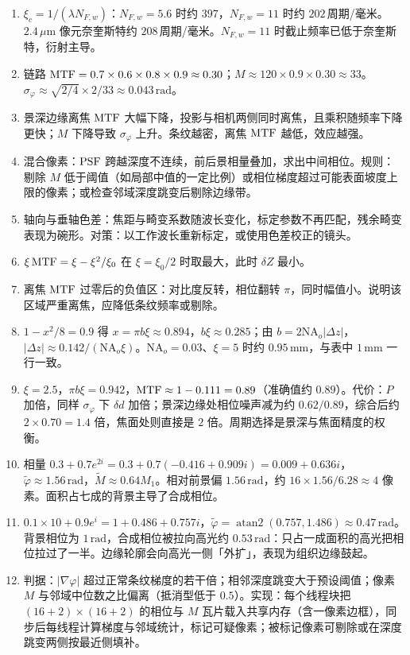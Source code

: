 \begin{enumerate}
  \item $\xi_c=1/(\lambda N_{F,w})$：$N_{F,w}=5.6$ 时约 $397$，$N_{F,w}=11$ 时约 $202\,$周期/毫米。$2.4\,\mu\mathrm{m}$ 像元奈奎斯特约 $208\,$周期/毫米。$N_{F,w}=11$ 时截止频率已低于奈奎斯特，衍射主导。
  \item 链路 $\mathrm{MTF}=0.7\times0.6\times0.8\times0.9\approx0.30$；$M\approx120\times0.9\times0.30\approx33$。$\sigma_\varphi\approx\sqrt{2/4}\times2/33\approx0.043\,\mathrm{rad}$。
  \item 景深边缘离焦 $\mathrm{MTF}$ 大幅下降，投影与相机两侧同时离焦，且乘积随频率下降更快；$M$ 下降导致 $\sigma_\varphi$ 上升。条纹越密，离焦 $\mathrm{MTF}$ 越低，效应越强。
  \item 混合像素：$\mathrm{PSF}$ 跨越深度不连续，前后景相量叠加，求出中间相位。规则：剔除 $M$ 低于阈值（如局部中值的一定比例）或相位梯度超过可能表面坡度上限的像素；或检查邻域深度跳变后剔除边缘带。
  \item 轴向与垂轴色差：焦距与畸变系数随波长变化，标定参数不再匹配，残余畸变表现为碗形。对策：以工作波长重新标定，或使用色差校正的镜头。
  \item $\xi\,\mathrm{MTF}=\xi-\xi^2/\xi_0$ 在 $\xi=\xi_0/2$ 时取最大，此时 $\delta Z$ 最小。
  \item 离焦 $\mathrm{MTF}$ 过零后的负值区：对比度反转，相位翻转 $\pi$，同时幅值小。说明该区域严重离焦，应降低条纹频率或剔除。
  \item $1-x^2/8=0.9$ 得 $x=\pi b\xi\approx0.894$，$b\xi\approx0.285$；由 $b=2\mathrm{NA}_o|\Delta z|$，$|\Delta z|\approx0.142/(\mathrm{NA}_o\xi)$。$\mathrm{NA}_o=0.03$、$\xi=5$ 时约 $0.95\,\mathrm{mm}$，与表中 $1\,\mathrm{mm}$ 一行一致。
  \item $\xi=2.5$，$\pi b\xi=0.942$，$\mathrm{MTF}\approx1-0.111=0.89$（准确值约 $0.89$）。代价：$P$ 加倍，同样 $\sigma_\varphi$ 下 $\delta d$ 加倍；景深边缘处相位噪声减为约 $0.62/0.89$，综合后约 $2\times0.70=1.4$ 倍，焦面处则直接是 $2$ 倍。周期选择是景深与焦面精度的权衡。
  \item 相量 $0.3+0.7e^{2i}=0.3+0.7(-0.416+0.909i)=0.009+0.636i$，$\tilde\varphi\approx1.56\,\mathrm{rad}$，$\tilde M\approx0.64M_1$。相对前景偏 $1.56\,\mathrm{rad}$，约 $16\times1.56/6.28\approx4$ 像素。面积占七成的背景主导了合成相位。
  \item $0.1\times10+0.9e^{i}=1+0.486+0.757i$，$\tilde\varphi=\operatorname{atan2}(0.757,1.486)\approx0.47\,\mathrm{rad}$。背景相位为 $1\,\mathrm{rad}$，合成相位被拉向高光约 $0.53\,\mathrm{rad}$：只占一成面积的高光把相位拉过了一半。边缘轮廓会向高光一侧「外扩」，表现为组织边缘鼓起。
  \item 判据：$|\nabla\varphi|$ 超过正常条纹梯度的若干倍；相邻深度跳变大于预设阈值；像素 $M$ 与邻域中位数之比偏离（抵消型低于 $0.5$）。实现：每个线程块把 $(16+2)\times(16+2)$ 的相位与 $M$ 瓦片载入共享内存（含一像素边框），同步后每线程计算梯度与邻域统计，标记可疑像素；被标记像素可剔除或在深度跳变两侧按最近侧填补。
\end{enumerate}
